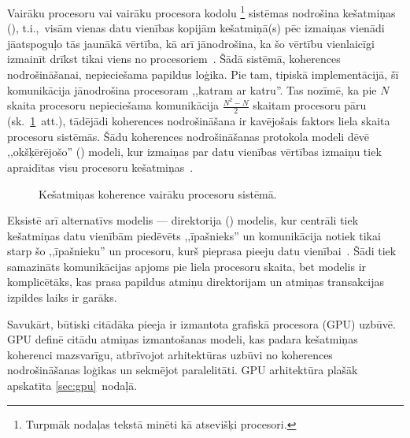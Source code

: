 Vairāku procesoru vai vairāku procesora kodolu%
\footnote{Turpmāk nodaļas tekstā minēti kā atsevišķi procesori.}
sistēmas nodrošina
kešatmiņas 
(), t.i.,~visām vienas datu vienības
kopijām kešatmiņā(s) pēc izmaiņas vienādi jāatspoguļo tās
jaunākā vērtība, kā arī jānodrošina, ka šo vērtību vienlaicīgi 
izmainīt drīkst tikai viens no procesoriem~\cite{Cache}.
Šādā sistēmā, koherences nodrošināšanai, nepieciešama papildus loģika.
Pie tam, tipiskā implementācijā, šī komunikācija
jānodrošina procesoram ,,katram ar katru''.
Tas nozīmē, ka pie $N$ skaita
procesoru nepieciešama komunikācija $\frac{N^2-N}{2}$ skaitam procesoru pāru
(sk.~\ref{fig:snoop-bottleneck}~att.), tādējādi koherences nodrošināšana ir
kavējošais faktors liela skaita procesoru sistēmās.
Šādu koherences nodrošināšanas protokola modeli dēvē ,,okšķērējošo''
() modeli, kur izmaiņas par datu vienības vērtības izmaiņu
tiek apraidītas visu procesoru kešatmiņas~\cite{Cache}.
\begin{figure}[tbh]
	\centering
	\def\svgscale{1.2}
	{}
	\caption{Kešatmiņas koherence vairāku procesoru sistēmā.}
	\label{fig:snoop-bottleneck}
\end{figure}

Eksistē arī alternatīvs modelis --- direktorija () modelis,
kur centrāli tiek kešatmiņas datu vienībām piedēvēts ,,īpašnieks''
un komunikācija notiek tikai starp šo ,,īpašnieku'' un procesoru, kurš
pieprasa pieeju datu vienībai~\cite{Cache}.
Šādi tiek samazināts komunikācijas apjoms pie
liela procesoru skaita, bet modelis ir komplicētāks, kas prasa papildus
atmiņu direktorijam un atmiņas transakcijas izpildes laiks ir garāks.

Savukārt, būtiski citādāka pieeja ir izmantota grafiskā procesora (GPU)
uzbūvē. GPU definē citādu atmiņas izmantošanas
modeli, kas padara kešatmiņas koherenci mazsvarīgu,
atbrīvojot arhitektūras uzbūvi no koherences nodrošināšanas loģikas un
sekmējot paralelitāti. GPU arhitektūra plašāk apskatīta \ref{sec:gpu}~nodaļā.




